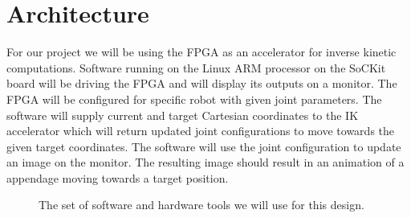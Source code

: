 \section{Architecture}
For our project we will be using the FPGA as an accelerator for
inverse kinetic computations. Software running on the Linux ARM processor 
on the SoCKit board will be driving the FPGA and will display its outputs on 
a monitor. The FPGA will be configured for specific robot with given joint 
parameters. The software will supply current and target Cartesian coordinates 
to the IK accelerator which will return updated joint configurations to 
move towards the given target coordinates. The software will use the 
joint configuration to update an image on the monitor. The resulting 
image should result in an animation of a appendage moving towards a target 
position.

\begin{figure}[ht]
\center
{}
\caption{The set of software and hardware tools we will use for this design.}
\label{fig:toolchain}
\end{figure}